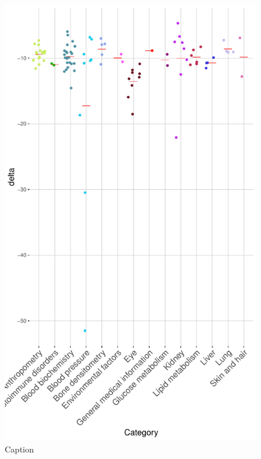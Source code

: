 \begin{figure}[htb]
    \centering
    \includegraphics[width=\textwidth]{chapter4/figures/deltaplot.pdf}
    \caption{Caption}
    \label{fig:4.2}
\end{figure}
